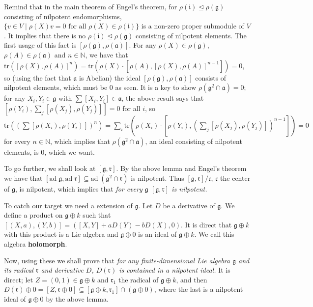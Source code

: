 \documentclass{article}
\newcommand{\NaN}{\mathbb{N}}
\newcommand{\SBar}{\;|\;}
\newcommand{\tr}[1]{\mathrm{tr}#1}
\newcommand{\lie}[1]{\mathfrak{#1}}
\newcommand{\ad}[1]{\mathrm{ad}\; #1}
\begin{document}
Remind that in the main theorem of Engel's theorem, for $\rho(\lie{i}) \trianglelefteq \rho(\lie{g})$ consisting of nilpotent endomorphisms, $\{v \in V \SBar \rho(X)v = 0 \textrm{ for all $\rho(X) \in \rho(\lie{i})$}\}$ is a non-zero proper submodule of $V$.
It implies that there is no $\rho(\lie{i}) \trianglelefteq \rho(\lie{g})$ consisting of nilpotent elements.
The first usage of this fact is $[\rho(\lie{g}), \rho(\lie{a})]$.
For any $\rho(X) \in \rho(\lie{g})$, $\rho(A) \in \rho(\lie{a})$ and $n \in \NaN$, we have that $\tr{([\rho(X), \rho(A)]^n)} = \tr{(\rho(X) \cdot [\rho(A), [\rho(X), \rho(A)]^{n - 1}])} = 0$, so (using the fact that $\lie{a}$ is Abelian) the ideal $[\rho(\lie{g}), \rho(\lie{a})]$ consists of nilpotent elements, which must be 0 as seen.
It is a key to show $\rho(\lie{g}^2 \cap \lie{a}) = 0$; for any $X_i, Y_i \in \lie{g}$ with $\sum [X_i, Y_i] \in \lie{a}$, the above result says that $[\rho(Y_i), \sum_j [\rho(X_j), \rho(Y_j)]] = 0$ for all $i$, so $\tr{((\sum [\rho(X_i), \rho(Y_i)])^n)} = \sum_i \tr{(\rho(X_i) \cdot [\rho(Y_i), (\sum_j [\rho(X_j), \rho(Y_j)])^{n - 1}])} = 0$ for every $n \in \NaN$, which implies that $\rho(\lie{g}^2 \cap \lie{a})$, an ideal consisting of nilpotent elements, is 0, which we want.

To go further, we shall look at $[\lie{g}, \lie{r}]$.
By the above lemma and Engel’s theorem we have that $[\ad{\lie{g}}, \ad{\lie{r}}] \subseteq \ad{(\lie{g}^2 \cap \lie{r})}$ is nilpotent.
Thus $[\lie{g}, \lie{r}] / \lie{c}$, $\lie{c}$ the center of $\lie{g}$, is nilpotent, which implies that \textit{for every $\lie{g}$ $[\lie{g}, \lie{r}]$ is nilpotent.}

To catch our target we need a extension of $\lie{g}$.
Let $D$ be a derivative of $\lie{g}$.
We define a product on $\lie{g} \oplus k$ such that $[(X, a), (Y, b)] = ([X, Y] + aD(Y) - bD(X), 0)$.
It is direct that $\lie{g} \oplus k$ with this product is a Lie algebra and $\lie{g} \oplus 0$ is an ideal of $\lie{g} \oplus k$.
We call this algebra \textbf{holomorph}.

Now, using these we shall prove that \textit{for any finite-dimensional Lie algebra $\lie{g}$ and its radical $\lie{r}$ and derivative $D$, $D(\lie{r})$ is contained in a nilpotent ideal.}
It is direct; let $Z = (0, 1) \in \lie{g} \oplus k$ and $\lie{r}_1$ the radical of $\lie{g} \oplus k$, and then $D(\lie{r}) \oplus 0 = [Z, \lie{r} \oplus 0] \subseteq [\lie{g} \oplus k, \lie{r}_1] \cap (\lie{g} \oplus 0)$, where the last is a nilpotent ideal of $\lie{g} \oplus 0$ by the above lemma.
\end{document}
